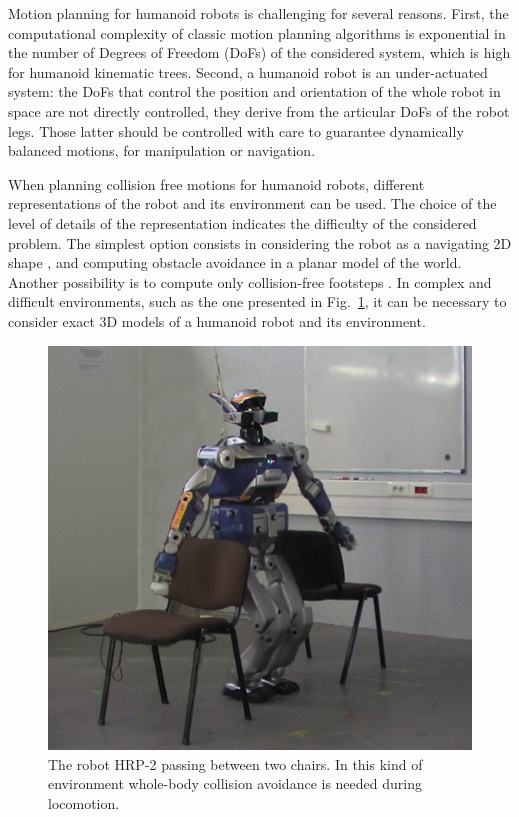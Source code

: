 \documentclass{article}
\begin{document}
Motion planning for humanoid robots is challenging for several reasons. First,
the computational complexity of classic motion planning algorithms is exponential
in the number of Degrees of Freedom (DoFs) of the considered system, which is
high for humanoid kinematic trees. Second, a humanoid robot is an under-actuated system:
the DoFs that control the position and orientation of the whole robot in space
are not directly controlled, they derive from the articular DoFs of the robot legs.
Those latter should be controlled with care to guarantee dynamically balanced motions,
for manipulation or navigation.

When planning collision free motions for humanoid robots, different representations
of the robot and its environment can be used. The choice of the level of details of
the representation indicates the difficulty of the considered problem. The simplest
option consists in considering the robot as a navigating 2D shape \cite{pettre20032}, and computing 
obstacle avoidance in a planar model of the world. Another possibility is to 
compute only collision-free footsteps  \cite{kuffner2001footstep}. 
In complex and difficult environments, such as the one presented in Fig.~\ref{fig:couv},
it can be necessary to consider exact 3D models of a humanoid robot and its environment.


\begin{figure}[h]
\centering
\includegraphics[width=0.6\linewidth]{pics/chairs/couv.png}
\caption{The robot HRP-2 passing between two chairs. In this kind of
  environment whole-body collision avoidance is needed during
  locomotion.} 
\label{fig:couv}
\end{figure}
\end{document}
